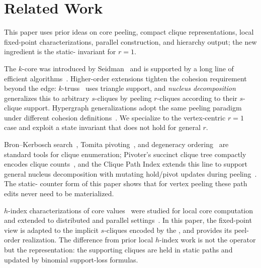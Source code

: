 \section{Related Work}\label{sec:related}

This paper uses prior ideas on core peeling, compact clique representations, local fixed-point characterizations, parallel construction, and hierarchy output; the new ingredient is the static-\cpi{} invariant for $r{=}1$.

The $k$-core was introduced by Seidman~\cite{kcoreSeidman} and is supported by a long line of efficient algorithms~\cite{coreAlg,batagelj2011fast,k-core1,kcore_3,kcore_4,io-eff,peel_cd,DBLP:journals/tkde/WenQZLY19,distributed_k-core,zhang2023efficient}.
%
Higher-order extensions tighten the cohesion requirement beyond the edge: $k$-truss~\cite{ktrussCohen,akbas2017truss,chen2020truss,huang2014truss} uses triangle support, and \emph{nucleus decomposition}~\cite{nucleusSariyuce14,nuclearTWEB} generalizes this to arbitrary $s$-cliques by peeling $r$-cliques according to their $s$-clique support.
%
Hypergraph generalizations adopt the same peeling paradigm under different cohesion definitions~\cite{nbr_cd,hyper_kcore,kg-core,kq-core}.
%
We specialize to the vertex-centric $r=1$ case and exploit a state invariant that does not hold for general $r$.

Bron--Kerbosch search~\cite{BronKerbosch}, Tomita pivoting~\cite{tomita}, and degeneracy ordering~\cite{eppstein} are standard tools for clique enumeration; Pivoter's succinct clique tree compactly encodes clique counts~\cite{Pivoter}, and the Clique Path Index extends this line to support general nucleus decomposition with mutating hold/pivot updates during peeling~\cite{NuclearCD}.
%
The static-\cpi{} counter form of this paper shows that for vertex peeling these path edits never need to be materialized.

$h$-index characterizations of core values~\cite{hindex} were studied for local core computation~\cite{lu2016hindex,LocalNuclear} and extended to distributed and parallel settings~\cite{distributed_k-core,zhang2023efficient}.
%
In this paper, the fixed-point view is adapted to the implicit $s$-cliques encoded by the \cpi{}, and \spinStar{} provides its peel-order realization.
%
The difference from prior local $h$-index work is not the operator but the representation: the supporting cliques are held in static \cpi{} paths and updated by binomial support-loss formulas.

